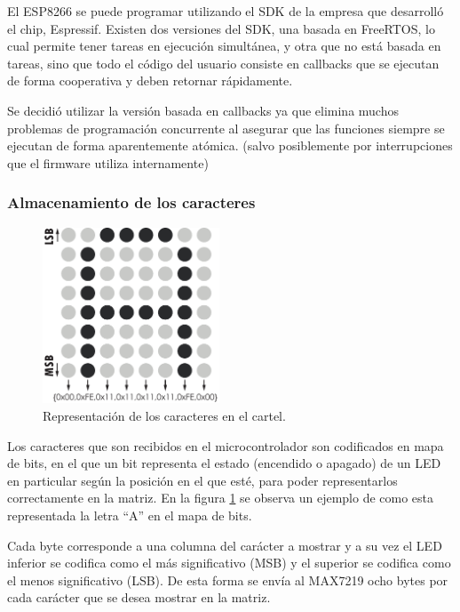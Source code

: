 El ESP8266 se puede programar utilizando el SDK de la empresa que desarrolló el chip, Espressif. Existen dos versiones del SDK, una basada en FreeRTOS, lo cual permite tener tareas en ejecución simultánea, y otra que no está basada en tareas, sino que todo el código del usuario consiste en callbacks que se ejecutan de forma cooperativa y deben retornar rápidamente.

Se decidió utilizar la versión basada en callbacks ya que elimina muchos problemas de programación concurrente al asegurar que las funciones siempre se ejecutan de forma aparentemente atómica. (salvo posiblemente por interrupciones que el firmware utiliza internamente)

\subsubsection{Almacenamiento de los caracteres}
\begin{figure}[h!]
    \centering
    \includegraphics[width=0.47\textwidth]{imagenes/codificacionAscii.pdf}
    \caption{Representación de los caracteres en el cartel.}
    \label{fig:repAscii}
\end{figure}


Los caracteres que son recibidos en el microcontrolador son codificados en mapa de bits, en el que un bit representa el estado (encendido o apagado) de un LED en particular según la posición en el que esté, para poder representarlos correctamente en la matriz. En la figura \ref{fig:repAscii} se observa un ejemplo de como esta representada la letra \enquote{A} en el mapa de bits.

Cada byte corresponde a una columna del carácter a mostrar y a su vez el LED inferior se codifica como el más significativo (MSB) y el superior se codifica como el menos significativo (LSB). De esta forma se envía al MAX7219 ocho bytes por cada carácter que se desea mostrar en la matriz.

